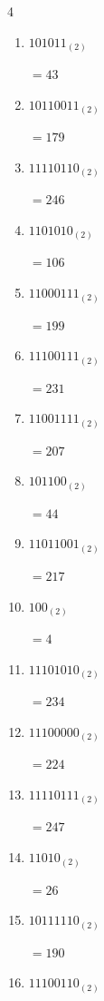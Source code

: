 \begin{multicols}{4}
\begin{enumerate}
        $=204$

\columnbreak %

  \item $101011_{(2)}$

        $=43$

  \item $10110011_{(2)}$

        $=179$

  \item $11110110_{(2)}$

        $=246$

  \item $1101010_{(2)}$

        $=106$

  \item $11000111_{(2)}$

        $=199$

  \item $11100111_{(2)}$

        $=231$

  \item $11001111_{(2)}$

        $=207$

  \item $101100_{(2)}$

        $=44$

  \item $11011001_{(2)}$

        $=217$

  \item $100_{(2)}$

        $=4$

  \item $11101010_{(2)}$

        $=234$

  \item $11100000_{(2)}$

        $=224$

  \item $11110111_{(2)}$

        $=247$

  \item $11010_{(2)}$

        $=26$

  \item $10111110_{(2)}$

        $=190$

\columnbreak %

  \item $11100110_{(2)}$


\end{enumerate}
\end{multicols}
